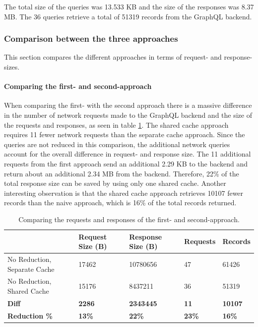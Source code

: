 \noindent The total size of the queries was 13.533 KB and the size of the responses was 8.37 MB. The 36 queries retrieve a total of 51319 records from the GraphQL backend.

\subsubsection{Comparison between the three approaches}

This section compares the different approaches in terms of request- and response-sizes.

\paragraph{Comparing the first- and second-approach}

When comparing the first- with the second approach there is a massive difference in the number of network requests made to the GraphQL backend and the size of the requests and responses, as seen in table \ref{table:results:size-comparison-first-path-no-cache-no-reduction-cache-no-reduction}. The shared cache approach requires 11 fewer network requests than the separate cache approach. Since the queries are not reduced in this comparison, the additional network queries account for the overall difference in request- and response size. The 11 additional requests from the first approach send an additional 2.29 KB to the backend and return about an additional 2.34 MB from the backend. Therefore, 22\% of the total response size can be saved by using only one shared cache. Another interesting observation is that the shared cache approach retrieves 10107 fewer records than the naive approach, which is 16\% of the total records returned.

\ifshowTables
\begin{table}[H]
    \begin{tabular}{|l|l|l|l|l|}
    \hline
      & Request Size (B) & Response Size (B) & Requests & Records \\
    \hline
     No Reduction, Separate Cache & 17462 & 10780656 & 47 & 61426 \\
     \hline
     No Reduction, Shared Cache & 15176 & 8437211 & 36 & 51319 \\
     \hline
     \hline
     \textbf{Diff} & \textbf{2286} & \textbf{2343445} & \textbf{11} & \textbf{10107} \\
     \hline
     \textbf{Reduction \%} & \textbf{13\%} & \textbf{22\%} & \textbf{23\%} & \textbf{16\%} \\
     \hline
    \end{tabular}
    \caption{Comparing the requests and responses of the first- and second-approach.}
    \label{table:results:size-comparison-first-path-no-cache-no-reduction-cache-no-reduction}
\end{table}
\fi

